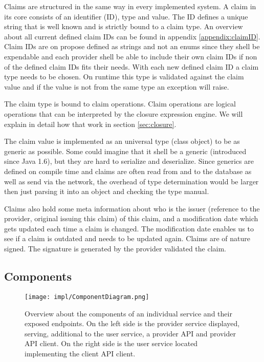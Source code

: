 Claims are structured in the same way in every implemented system. A claim in its core consists of an identifier (ID), type and value. The ID defines a unique string that is well known and is strictly bound to a claim type. 
An overview about all current defined claim IDs can be found in appendix \ref{appendix:claimID}. Claim IDs are on propose defined as strings and not an enums since they shell be expendable and each provider shell be able to include their own claim IDs if non of the defined claim IDs fits their needs. With each new defined claim ID a claim type needs to be chosen. On runtime this type is validated against the claim value and if the value is not from the same type an exception will raise. 

The claim type is bound to claim operations. Claim operations are logical operations that can be interpreted by the closure expression engine. We will explain in detail how that work in section \ref{sec:closure}. 

The claim value is implemented as an universal type (class object) to be as generic as possible. Some could imagine that it shell be a generic (introduced since Java 1.6), but they are hard to serialize and deserialize. Since generics are defined on compile time and claims are often read from and to the database as well as send via the network, the overhead of type determination would be larger then just parsing it into an object and checking the type manual. 

Claims also hold some meta information about who is the issuer (reference to the provider, original issuing this claim) of this claim, and a modification date which gets updated each time a claim is changed. The modification date enables us to see if a claim is outdated and needs to be updated again. Claims are of nature signed. The signature is generated by the provider validated the claim. 

\subsection{Components}
\begin{figure}
\texttt{[image: impl/ComponentDiagram.png]}
\centering
\caption{Overview about the components of an individual service and their exposed endpoints. On the left side is the provider service displayed, serving, additional to the user service, a provider API and provider API client. On the right side is the user service located implementing the client API client.}
\label{fig:componentDiagram}
\end{figure}

